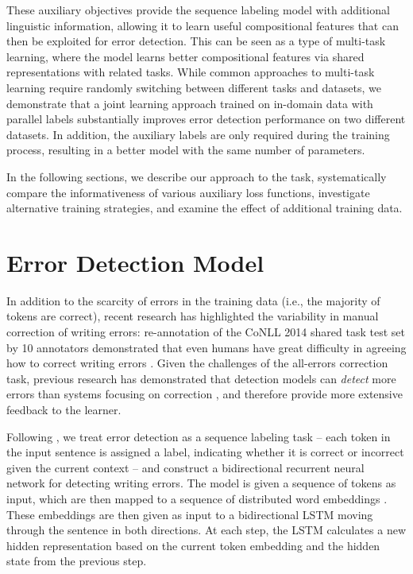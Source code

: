 \documentclass[11pt,letterpaper]{article}
\begin{document}
These auxiliary objectives provide the sequence labeling model with additional linguistic information, allowing it to learn useful compositional features that can then be exploited for error detection. This can be seen as a type of multi-task learning, where the model learns better compositional features via shared representations with related tasks. 
While common approaches to multi-task learning require randomly switching between different tasks and datasets, we demonstrate that a joint learning approach trained on in-domain data with parallel labels substantially improves error detection performance on two different datasets. 
In addition, the auxiliary labels are only required during the training process, resulting in a better model with the same number of parameters. 

In the following sections, we describe our approach to the task, systematically compare the informativeness of various auxiliary loss functions, investigate alternative training strategies, and examine the effect of additional training data. 


\section{Error Detection Model}
\label{sec:errordet}

In addition to the scarcity of errors in the training data (i.e., the majority of tokens are correct), recent research has highlighted the variability in manual correction of
writing errors: re-annotation of the CoNLL 2014 shared task test set
by 10 annotators demonstrated that even humans have great difficulty in agreeing how to correct writing errors \cite{bryantfar}. Given the challenges of the all-errors correction task, previous research has demonstrated that detection models can \textit{detect} more errors than systems focusing on correction \cite{Rei2016}, and therefore provide more extensive feedback to the learner.  

Following , we treat error detection as a sequence labeling task -- each token in the input sentence is assigned a label, indicating whether it is correct or incorrect given the current context -- and construct a bidirectional recurrent neural network for detecting writing errors.
The model is given a sequence of tokens as input, which are then mapped to a sequence of distributed word embeddings .
These embeddings are then given as input to a bidirectional LSTM \cite{Hochreiter1997} moving through the sentence in both directions. At each step, the LSTM calculates a new hidden representation based on the current token embedding and the hidden state from the previous step. 
\end{document}
